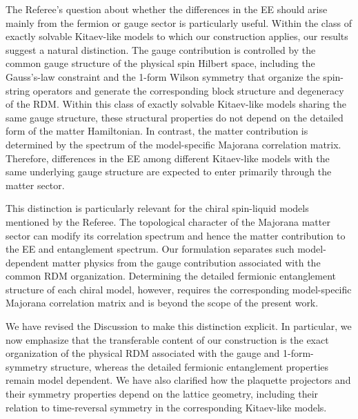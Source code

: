 \documentclass[12pt]{article}
\begin{document}
\begin{enumerate}
    The Referee's question about whether the differences in the EE should arise mainly from the fermion or gauge sector is particularly useful. 
    Within the class of exactly solvable Kitaev-like models to which our construction applies, our results suggest a natural distinction. 
    The gauge contribution is controlled by the common gauge structure of the physical spin Hilbert space, including the Gauss's-law constraint and the 1-form Wilson symmetry that organize the spin-string operators and generate the corresponding block structure and degeneracy of the RDM. 
    Within this class of exactly solvable Kitaev-like models sharing the same gauge structure, these structural properties do not depend on the detailed form of the matter Hamiltonian.
    In contrast, the matter contribution is determined by the spectrum of the model-specific Majorana correlation matrix. 
    Therefore, differences in the EE among different Kitaev-like models with the same underlying gauge structure are expected to enter primarily through the matter sector.

    This distinction is particularly relevant for the chiral spin-liquid models mentioned by the Referee. 
    The topological character of the Majorana matter sector can modify its correlation spectrum and hence the matter contribution to the EE and entanglement spectrum. 
    Our formulation separates such model-dependent matter physics from the gauge contribution associated with the common RDM organization. 
    Determining the detailed fermionic entanglement structure of each chiral model, however, requires the corresponding model-specific Majorana correlation matrix and is beyond the scope of the present work.

    We have revised the Discussion to make this distinction explicit. In particular, we now emphasize that the transferable content of our construction is the exact organization of the physical RDM associated with the gauge and 1-form-symmetry structure, whereas the detailed fermionic entanglement properties remain model dependent. 
    We have also clarified how the plaquette projectors and their symmetry properties depend on the lattice geometry, including their relation to time-reversal symmetry in the corresponding Kitaev-like models.
    
\end{enumerate}

\end{document}

